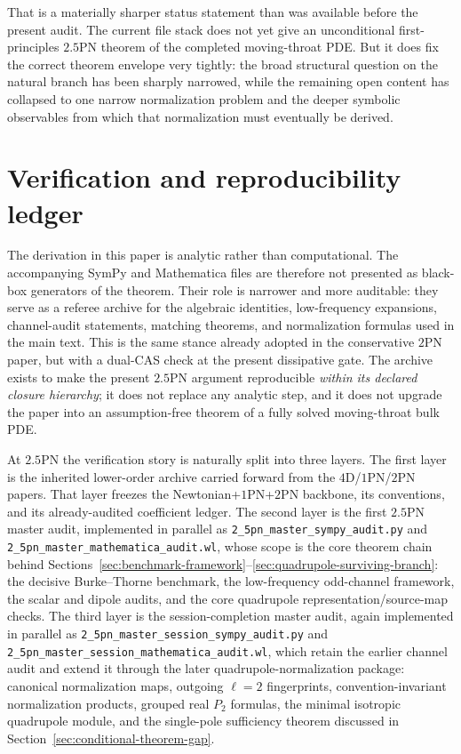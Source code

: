 \documentclass[11pt]{article}
\begin{document}
That is a materially sharper status statement than was available before the
present audit.  The current file stack does not yet give an unconditional
first-principles $2.5$PN theorem of the completed moving-throat PDE.  But it does
fix the correct theorem envelope very tightly: the broad structural question on
the natural branch has been sharply narrowed, while the remaining open content has collapsed
to one narrow normalization problem and the deeper symbolic observables from
which that normalization must eventually be derived.

\section{Verification and reproducibility ledger}
\label{sec:verification}

The derivation in this paper is analytic rather than computational.  The
accompanying SymPy and Mathematica files are therefore not presented as black-
box generators of the theorem.  Their role is narrower and more auditable: they
serve as a referee archive for the algebraic identities, low-frequency
expansions, channel-audit statements, matching theorems, and normalization
formulas used in the main text.  This is the same stance already adopted in the
conservative $2$PN paper, but with a dual-CAS check at the present dissipative
gate.  The archive exists to make the present $2.5$PN argument reproducible
\emph{within its declared closure hierarchy}; it does not replace any analytic
step, and it does not upgrade the paper into an assumption-free theorem of a
fully solved moving-throat bulk PDE.

At $2.5$PN the verification story is naturally split into three layers.  The
first layer is the inherited lower-order archive carried forward from the
$4$D/$1$PN/$2$PN papers.  That layer freezes the Newtonian+$1$PN+$2$PN backbone,
its conventions, and its already-audited coefficient ledger.  The second layer
is the first $2.5$PN master audit, implemented in parallel as
\texttt{2\_5pn\_master\_sympy\_audit.py} and
\texttt{2\_5pn\_master\_mathematica\_audit.wl}, whose scope is the core theorem
chain behind Sections~\ref{sec:benchmark-framework}--\ref{sec:quadrupole-surviving-branch}:
the decisive Burke--Thorne benchmark, the low-frequency odd-channel framework,
the scalar and dipole audits, and the core quadrupole representation/source-map
checks.  The third layer is the session-completion master audit, again
implemented in parallel as
\texttt{2\_5pn\_master\_session\_sympy\_audit.py} and\\
\texttt{2\_5pn\_master\_session\_mathematica\_audit.wl}, which retain the
earlier channel audit and extend it through the later
quadrupole-normalization package: canonical normalization maps, outgoing
$\ell=2$ fingerprints, convention-invariant normalization products, grouped
real $P_2$ formulas, the minimal isotropic quadrupole module, and the
single-pole sufficiency theorem discussed in
Section~\ref{sec:conditional-theorem-gap}.
\end{document}
